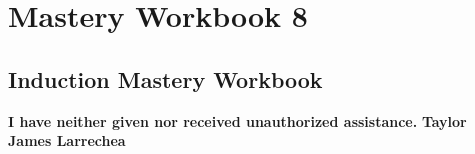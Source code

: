 \clearpage
\chapter{Mastery Workbook 8}

\section{Induction Mastery Workbook}


\begin{center}
    \Large{\textbf{I have neither given nor received unauthorized assistance.}}
    \large{\textbf{Taylor James Larrechea}}
\end{center}

